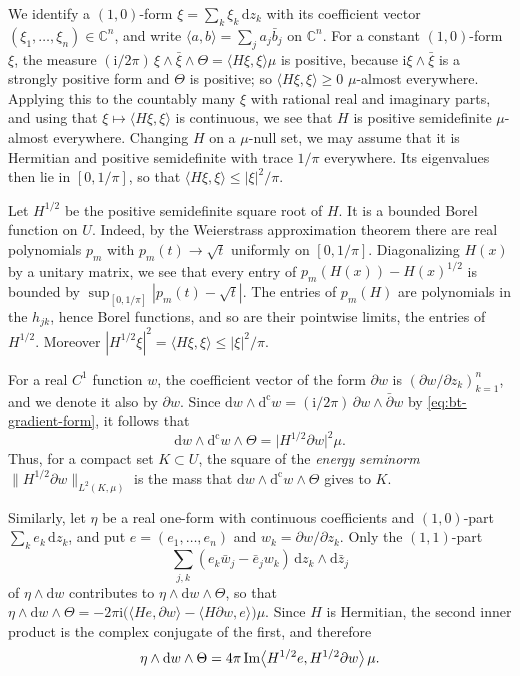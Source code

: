 We identify a $(1,0)$-form $\xi=\sum_k\xi_k\,\mathrm dz_k$ with its coefficient vector $(\xi_1,\ldots,\xi_n)\in\mathbb C^n$, and write $\langle a,b\rangle=\sum_ja_j\bar b_j$ on $\mathbb C^n$. For a constant $(1,0)$-form $\xi$, the measure $(\mathrm i/2\pi)\,\xi\wedge\bar\xi\wedge\Theta=\langle H\xi,\xi\rangle\mu$ is positive, because $\mathrm i\xi\wedge\bar\xi$ is a strongly positive form and $\Theta$ is positive; so $\langle H\xi,\xi\rangle\geq0$ $\mu$-almost everywhere. Applying this to the countably many $\xi$ with rational real and imaginary parts, and using that $\xi\mapsto\langle H\xi,\xi\rangle$ is continuous, we see that $H$ is positive semidefinite $\mu$-almost everywhere. Changing $H$ on a $\mu$-null set, we may assume that it is Hermitian and positive semidefinite with trace $1/\pi$ everywhere. Its eigenvalues then lie in $[0,1/\pi]$, so that $\langle H\xi,\xi\rangle\leq|\xi|^2/\pi$.

Let $H^{1/2}$ be the positive semidefinite square root of $H$. It is a bounded Borel function on $U$. Indeed, by the Weierstrass approximation theorem there are real polynomials $p_m$ with $p_m(t)\to\sqrt t$ uniformly on $[0,1/\pi]$. Diagonalizing $H(x)$ by a unitary matrix, we see that every entry of $p_m(H(x))-H(x)^{1/2}$ is bounded by $\sup_{[0,1/\pi]}|p_m(t)-\sqrt t|$. The entries of $p_m(H)$ are polynomials in the $h_{jk}$, hence Borel functions, and so are their pointwise limits, the entries of $H^{1/2}$. Moreover $|H^{1/2}\xi|^2=\langle H\xi,\xi\rangle\leq|\xi|^2/\pi$.

For a real $C^1$ function $w$, the coefficient vector of the form $\partial w$ is $(\partial w/\partial z_k)_{k=1}^n$, and we denote it also by $\partial w$. Since $\mathrm dw\wedge\mathrm d^{\mathrm c}w=(\mathrm i/2\pi)\,\partial w\wedge\bar\partial w$ by \eqref{eq:bt-gradient-form}, it follows that
\begin{equation}\label{eq:current-gradient-density}
 \mathrm dw\wedge\mathrm d^{\mathrm c}w\wedge\Theta=\bigl|H^{1/2}\partial w\bigr|^2\mu.
\end{equation}
Thus, for a compact set $K\subset U$, the square of the \emph{energy seminorm} $\|H^{1/2}\partial w\|_{L^2(K,\mu)}$ is the mass that $\mathrm dw\wedge\mathrm d^{\mathrm c}w\wedge\Theta$ gives to $K$.

Similarly, let $\eta$ be a real one-form with continuous coefficients and $(1,0)$-part $\sum_ke_k\,\mathrm dz_k$, and put $e=(e_1,\ldots,e_n)$ and $w_k=\partial w/\partial z_k$. Only the $(1,1)$-part
\[
 \sum_{j,k}(e_k\bar w_j-\bar e_jw_k)\,\mathrm dz_k\wedge\mathrm d\bar z_j
\]
of $\eta\wedge\mathrm dw$ contributes to $\eta\wedge\mathrm dw\wedge\Theta$, so that $\eta\wedge\mathrm dw\wedge\Theta=-2\pi\mathrm i\bigl(\langle He,\partial w\rangle-\langle H\partial w,e\rangle\bigr)\mu$. Since $H$ is Hermitian, the second inner product is the complex conjugate of the first, and therefore
\begin{equation}\label{eq:current-gradient-pairing}
 \eta\wedge\mathrm dw\wedge\Theta=4\pi\operatorname{Im}\bigl\langle H^{1/2}e,H^{1/2}\partial w\bigr\rangle\,\mu.
\end{equation}

